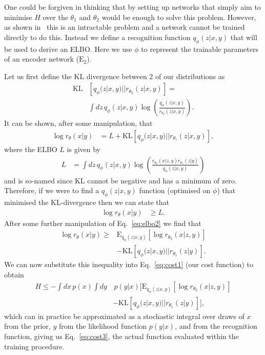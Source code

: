 One could be forgiven in thinking that by setting up networks that simply aim
to minimise $H$ over the $\theta_{1}$ and $\theta_{2}$ would be enough to solve
this problem. However, as shown in~\cite{NIPS2015_5775} this is an intractable
problem and a network cannot be trained directly to do this. Instead we define
a recognition function $q_{\phi}(z|x,y)$ that will be used to derive an
\ac{ELBO}. Here we use $\phi$ to represent the trainable parameters of an
encoder network ($\text{E}_{2}$).

Let us first define the \ac{KL} divergence between 2 of our
distributions as
%
\begin{align}\label{eq:kl}
\text{KL}&\left[q_{\phi}(z|x,y)||r_{\theta_{2}}(z|x,y)\right] = \\
&\int dz\,q_{\phi}(z|x,y)
\log\left(\frac{q_{\phi}(z|x,y)}{r_{\theta_{2}}(z|x,y)}\right).\nonumber
\end{align}
%  
It can be shown, after some manipulation, that
%
\begin{align}\label{eq:elbo1}
\log r_{\theta}(x|y) &= L + \text{KL}\left[q_{\phi}(z|x,y)||r_{\theta_{?}}(z|x,y)\right],
\end{align}
%
where the \ac{ELBO} $L$ is given by
%
\begin{align}\label{eq:elbo2}
L &= \int dz\,
q_{\phi}(z|x,y)\log\left(\frac{r_{\theta_{2}}(x|z,y)r_{\theta_{1}}(z|y)}{q_{\phi}(z|x,y)}\right)
\end{align}
%
and is so-named since $\text{KL}$ cannot be negative and has a minimum of zero.
Therefore, if we were to find a $q_{\phi}(z|x,y)$ function (optimised on
$\phi$) that minimised the \ac{KL}-divergence then we can state that
%
\begin{align}
\log r_{\theta}(x|y) &\geq L.
\end{align}
%
After some further manipulation of Eq.~\ref{eq:elbo2} we find that
%
\begin{align}\label{eq:logr}
\log r_{\theta}(x|y) \geq  &\text{E}_{q_{\phi}(z|x,y)}\left[\log
r_{\theta_{2}}(x|z,y)\right] \nonumber\\
&-\text{KL}\left[q_{\phi}(z|x,y)||r_{\theta_{1}}(z|y)\right].
\end{align}
%
We can now substitute this inequality into Eq.~\ref{eq:cost1} (our cost
function) to obtain
%
\begin{align}\label{eq:cost2}
H \leq  -\int dx\, p(x)\int dy &\,p(y|x)
\Big[\text{E}_{q_{\phi}(z|x,y)}\left[\log r_{\theta_{2}}(x|z,y)\right]
\nonumber\\
&-\text{KL}\left[q_{\phi}(z|x,y)||r_{\theta_{1}}(z|y)\right]\Big],  
\end{align}
%
which can in practice be approximated as a stochastic integral over draws of
$x$ from the prior, $y$ from the likelihood function $p(y|x)$, and from the
recognition function, giving us Eq.~\ref{eq:cost3}, the actual function
evaluated within the training procedure.

